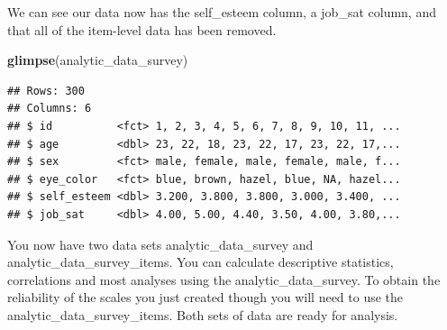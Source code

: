\documentclass[
]{krantz}
\makeatletter
\newenvironment{Shaded}{\begin{snugshade}}{\end{snugshade}}
\newcommand{\DataTypeTok}[1]{\textcolor[rgb]{0.27,0.27,0.27}{#1}}
\newcommand{\KeywordTok}[1]{\textcolor[rgb]{0.27,0.27,0.27}{\textbf{#1}}}
\newcommand{\NormalTok}[1]{#1}
\newcommand{\OperatorTok}[1]{\textcolor[rgb]{0.43,0.43,0.43}{\textbf{#1}}}
\newcommand{\OtherTok}[1]{\textcolor[rgb]{0.37,0.37,0.37}{#1}}
\newcommand{\StringTok}[1]{\textcolor[rgb]{0.5,0.5,0.5}{#1}}
\newenvironment{kframe}{%
\medskip{}
\setlength{\fboxsep}{.8em}
 \def\at@end@of@kframe{}%
 \ifinner\ifhmode%
  \def\at@end@of@kframe{\end{minipage}}%
  \begin{minipage}{\columnwidth}%
 \fi\fi%
 \def\FrameCommand##1{\hskip\@totalleftmargin \hskip-\fboxsep
 \colorbox{shadecolor}{##1}\hskip-\fboxsep
     \hskip-\linewidth \hskip-\@totalleftmargin \hskip\columnwidth}%
 \MakeFramed {\advance\hsize-\width
   \@totalleftmargin\z@ \linewidth\hsize
   \@setminipage}}%
 {\par\unskip\endMakeFramed%
 \at@end@of@kframe}
\renewenvironment{Shaded}{\begin{kframe}}{\end{kframe}}
\makeatother
\begin{document}
\begin{Shaded}
\end{Shaded}

We can see our data now has the self\_esteem column, a job\_sat column, and that all of the item-level data has been removed.

\begin{Shaded}
\begin{Highlighting}[]
\KeywordTok{glimpse}\NormalTok{(analytic_data_survey)}
\end{Highlighting}
\end{Shaded}

\begin{verbatim}
## Rows: 300
## Columns: 6
## $ id          <fct> 1, 2, 3, 4, 5, 6, 7, 8, 9, 10, 11, ...
## $ age         <dbl> 23, 22, 18, 23, 22, 17, 23, 22, 17,...
## $ sex         <fct> male, female, male, female, male, f...
## $ eye_color   <fct> blue, brown, hazel, blue, NA, hazel...
## $ self_esteem <dbl> 3.200, 3.800, 3.800, 3.000, 3.400, ...
## $ job_sat     <dbl> 4.00, 5.00, 4.40, 3.50, 4.00, 3.80,...
\end{verbatim}

You now have two data sets analytic\_data\_survey and analytic\_data\_survey\_items. You can calculate descriptive statistics, correlations and most analyses using the analytic\_data\_survey. To obtain the reliability of the scales you just created though you will need to use the analytic\_data\_survey\_items. Both sets of data are ready for analysis.
\end{document}
